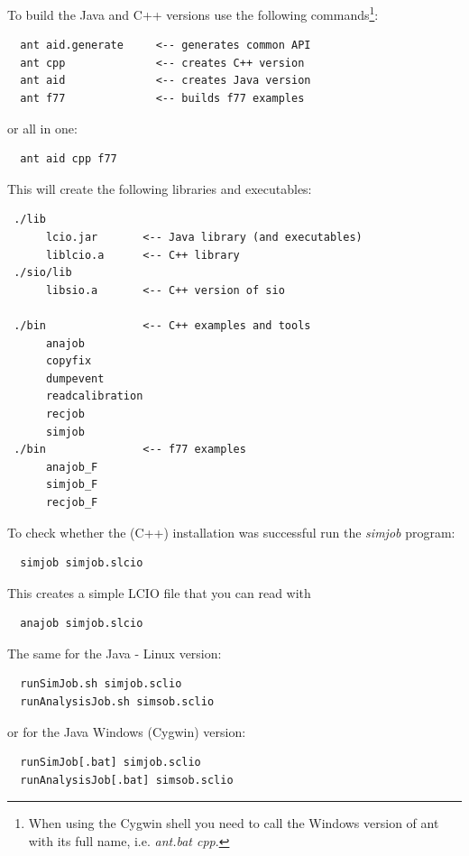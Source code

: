 \documentclass[twoside]{article}
\begin{document}



To build the Java and C++ versions use the following commands\footnote{When using the Cygwin shell you need to
call the Windows version of ant with its full name, i.e. {\em ant.bat cpp}.}:
\begin{verbatim}
  ant aid.generate     <-- generates common API
  ant cpp              <-- creates C++ version
  ant aid              <-- creates Java version
  ant f77              <-- builds f77 examples
\end{verbatim}
or all in one:
\begin{verbatim}
  ant aid cpp f77
\end{verbatim}

This will create the following libraries and executables:

\begin{verbatim}
 ./lib
      lcio.jar       <-- Java library (and executables)
      liblcio.a      <-- C++ library
 ./sio/lib
      libsio.a       <-- C++ version of sio 

 ./bin               <-- C++ examples and tools
      anajob
      copyfix
      dumpevent
      readcalibration
      recjob
      simjob
 ./bin               <-- f77 examples
      anajob_F
      simjob_F
      recjob_F 

\end{verbatim}

To check whether the (C++) installation was successful run the {\it simjob} program:
\begin{verbatim}
  simjob simjob.slcio
\end{verbatim}
This creates a simple LCIO file that you can read with 
\begin{verbatim}
  anajob simjob.slcio
\end{verbatim}
The same for the Java - Linux version:
\begin{verbatim}
  runSimJob.sh simjob.sclio
  runAnalysisJob.sh simsob.sclio
\end{verbatim}
or for the Java Windows (Cygwin) version:
\begin{verbatim}
  runSimJob[.bat] simjob.sclio
  runAnalysisJob[.bat] simsob.sclio
\end{verbatim}
\end{document}
